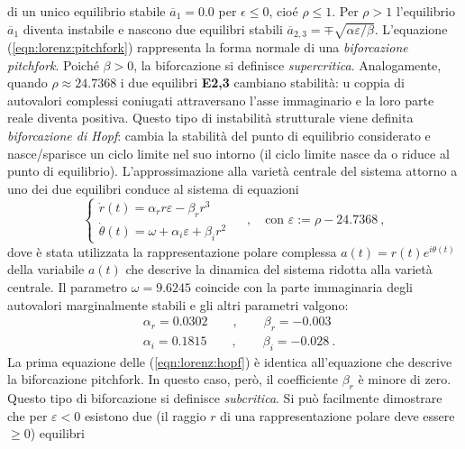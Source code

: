  di un unico equilibrio stabile $\overline{a}_1 = 0.0$ per $\epsilon \leq 0$, cioé $\rho \leq 1$.
 Per $\rho > 1$ l'equilibrio $\overline{a}_1$ diventa instabile e nascono due equilibri stabili
 $\overline{a}_{2,3} = \mp \sqrt{\alpha \varepsilon / \beta}$.
L'equazione (\ref{eqn:lorenz:pitchfork}) rappresenta la forma normale di una \textit{biforcazione
 pitchfork}. Poiché $\beta > 0$, la biforcazione si definisce \textit{supercritica}.
\newline
Analogamente, quando $\rho \approx 24.7368$ i due equilibri \textbf{E2,3} cambiano stabilità: u
 coppia di autovalori complessi coniugati attraversano l'asse immaginario e la loro parte
 reale diventa positiva. Questo tipo di instabilità strutturale viene definita
 \textit{biforcazione di Hopf}: cambia la stabilità del punto di equilibrio considerato 
 e nasce/sparisce un ciclo limite nel suo intorno (il ciclo limite nasce da o riduce al
 punto di equilibrio).
L'approssimazione alla varietà centrale del sistema attorno a uno dei due equilibri conduce 
 al sistema di equazioni
\begin{equation}\label{eqn:lorenz:hopf}
\begin{cases}
 \dot{r}(t) = \alpha_r r \varepsilon - \beta_r r^3 \\
 \dot{\theta}(t) = \omega + \alpha_i \varepsilon + \beta_i r^2 \ 
\end{cases} \quad , \quad 
 \text{con } \varepsilon := \rho-24.7368 \ ,
\end{equation}
dove è stata utilizzata la rappresentazione polare complessa $a(t) = r(t) e^{i \theta(t)}$
 della variabile $a(t)$ che descrive la dinamica del sistema ridotta alla varietà centrale.
 Il parametro $\omega = 9.6245$ coincide con la parte immaginaria degli autovalori marginalmente
 stabili e gli altri parametri valgono:
\begin{equation}
\begin{aligned}
 & \alpha_r = 0.0302 \qquad , \qquad \beta_r =-0.003 \\
 & \alpha_i = 0.1815 \qquad , \qquad \beta_i =-0.028 \ . 
\end{aligned}
\end{equation}
La prima equazione delle (\ref{eqn:lorenz:hopf}) è identica all'equazione che descrive la 
 biforcazione pitchfork. In questo caso, però, il coefficiente $\beta_r$ è minore di zero. Questo
 tipo di biforcazione si definisce \textit{subcritica}. Si può facilmente dimostrare che
 per $\varepsilon < 0$ esistono due (il raggio $r$ di una rappresentazione polare deve
 essere $\geq 0$) equilibri
